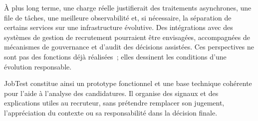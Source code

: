 À plus long terme, une charge réelle justifierait des traitements asynchrones, une file de tâches, une meilleure observabilité et, si nécessaire, la séparation de certains services sur une infrastructure évolutive. Des intégrations avec des systèmes de gestion de recrutement pourraient être envisagées, accompagnées de mécanismes de gouvernance et d'audit des décisions assistées. Ces perspectives ne sont pas des fonctions déjà réalisées~; elles dessinent les conditions d'une évolution responsable.

JobTest constitue ainsi un prototype fonctionnel et une base technique cohérente pour l'aide à l'analyse des candidatures. Il organise des signaux et des explications utiles au recruteur, sans prétendre remplacer son jugement, l'appréciation du contexte ou sa responsabilité dans la décision finale.
